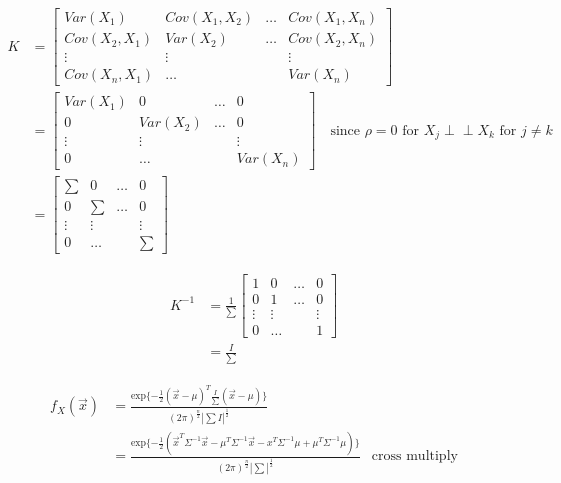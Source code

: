 \documentclass[12pt, a4paper, titlepage, fleqn]{article}
\begin{document}
\begin{align}
	K &= 
	\begin{bmatrix}
		Var(X_1)     & Cov(X_1,X_2) & \dots & Cov(X_1,X_n) \\
		Cov(X_2,X_1) & Var(X_2)     & \dots & Cov(X_2,X_n) \\
		\vdots		 & \vdots		& 		& \vdots	   \\
		Cov(X_n,X_1) & \dots		& 		& Var(X_n)
	\end{bmatrix}
	\\
	&= 
	\begin{bmatrix}
		Var(X_1)     & 0			& \dots & 0			   \\
		0			 & Var(X_2)     & \dots & 0			   \\
		\vdots		 & \vdots		& 		& \vdots	   \\
		0			 & \dots		& 		& Var(X_n)
	\end{bmatrix}
	\hspace{12pt}
	\text{since $\rho = 0$ for $X_j \perp\!\!\!\perp X_k$ for $j \neq k$}
	\\
	&= 
	\begin{bmatrix}
		\sum	     & 0			& \dots & 0			   \\
		0			 & \sum		    & \dots & 0			   \\
		\vdots		 & \vdots		& 		& \vdots	   \\
		0			 & \dots		& 		& \sum
	\end{bmatrix}
\end{align}

\begin{align}
	K^{-1} &= \frac{1}{\sum}
	\begin{bmatrix}
		1		     & 0			& \dots & 0			   \\
		0			 & 1		    & \dots & 0			   \\
		\vdots		 & \vdots		& 		& \vdots	   \\
		0			 & \dots		& 		& 1
	\end{bmatrix}
	\\
	&= \frac{I}{\sum}
\end{align}

\pagebreak

\begin{align}
	f_{X}(\vec{x}) &= \frac{\text{exp}\{-\frac{1}{2}(\vec{x}-\mu)^T \frac{I}{\sum} (\vec{x}-\mu)\}}{(2\pi)^{\frac{n}{2}}|\sum I|^\frac{1}{2}}
	\\
	&= \frac{\text{exp}\{-\frac{1}{2}(\vec{x}^T\Sigma^{-1}\vec{x}-\mu^T\Sigma^{-1}\vec{x}-x^T\Sigma^{-1}\mu+\mu^T\Sigma^{-1}\mu)\}}{(2\pi)^{\frac{n}{2}}|\sum|^\frac{1}{2}}
	& \text{cross multiply}
\end{align}
\end{document}
